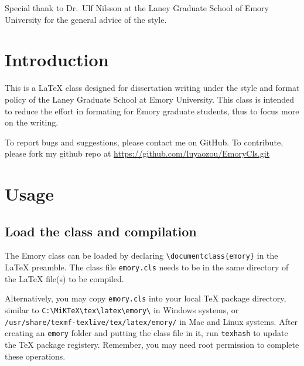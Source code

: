 \documentclass[draft]{emory}
\begin{document}
\begin{acknowledgement}
Special thank to Dr.~Ulf Nilsson at the Laney Graduate School of Emory University
for the general advice of the style.

\end{acknowledgement}

\maketoc

\chapter{Introduction}

This is a \LaTeX{} class designed for dissertation writing under the style and
format policy of the Laney Graduate School at Emory University.\cite{emory-style}
This class is
intended to reduce the effort in formating for Emory graduate students, thus 
to focus more on the writing. 

To report bugs and suggestions, please contact me on GitHub. To contribute, 
please fork my github repo at \url{https://github.com/luyaozou/EmoryCls.git}

\chapter{Usage}
\section{Load the class and compilation}
The Emory class can be loaded by declaring
\Verb|\documentclass{emory}| in the \LaTeX{} preamble. The class file
\Verb|emory.cls| needs to be in the same directory of the \LaTeX{} file(s) to be 
compiled. 

Alternatively, you may copy \Verb|emory.cls| into your local \TeX{} package 
directory, similar to \Verb|C:\MiKTeX\tex\latex\emory\| in Windows systems, or\\
\Verb|/usr/share/texmf-texlive/tex/latex/emory/| in Mac and Linux systems. After
creating an \Verb|emory| folder and putting the class file in it, run
\Verb|texhash| to update the \TeX{} package registery. Remember, you may need
root permission to complete these operations. 
\end{document}
